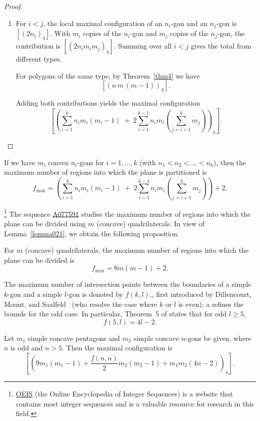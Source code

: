 \documentclass[article,11pt]{amsart} \numberwithin{equation}{section}
\numberwithin{equation}{section}
\begin{document}
{\begin{proof}
\begin{enumerate}
	\item[(ii)]
	For $i<j$, the local maximal configuration of an $n_i$-gon and an $n_j$-gon is $[(2n_i)_4]$.  
	With $m_i$ copies of the $n_i$-gon and $m_j$ copies of the $n_j$-gon, the contribution is $[(2n_i m_i m_j)_4]$.  
	Summing over all $i<j$ gives the total from different types.  
	
	For polygons of the same type, by Theorem~\ref{thm4} we have $$[(n\,m\,(m-1))_4].$$  
	
	Adding both contributions yields the maximal configuration
	\[
	\left[ \left( \sum_{i=1}^{k} n_i m_i (m_i-1) \;+\; 2\sum_{i=1}^{k-1} n_i m_i \left( \sum_{j=i+1}^{k} m_j \right) \right)_4 \right].
	\]
	
\end{enumerate}	
\end{proof}

\begin{cor}
If we have $m_i$ convex $n_i$-gons for $i=1,\dots,k$ (with $n_1 < n_2 < \dots < n_k$), then the maximum number of regions into which the plane is partitioned is
\[
f_{\max}= \left( \sum_{i=1}^{k} n_i m_i (m_i-1) \;+\; 2\sum_{i=1}^{k-1} n_i m_i \left( \sum_{j=i+1}^{k} m_j \right) \right) + 2.
\]

\end{cor}
\footnote{\href{https://oeis.org/}{OEIS} (the Online Encyclopedia of Integer Sequences) is a website that contains most integer sequences and is a valuable resource for research in this field.} The sequence \href{https://oeis.org/search?q=A077591&language=english&go=Search}{A077591} studies the maximum number of regions into which the plane can be divided using $m$ (concave) quadrilaterals. In view of Lemma~\ref{lemma021}, we obtain the following proposition.

\begin{inp}
For $m$ (concave) quadrilaterals, the maximum number of regions into which the plane can be divided is
\[
f_{\max}= 8m(m-1)+2.
\]
\end{inp}

The maximum number of intersection points between the boundaries of a simple $k$-gon and a simple $l$-gon is denoted by $f(k,l)$,, first introduced by Dillencourt, Mount, and Saalfeld~\cite{DMS93} (who resolve the case where $k$ or $l$ is even); a \cite{Cerny} refines the bounds for the odd case. In particular, Theorem~5 of \cite{Cerny} states that for odd $l\ge 5$,
\[
f(5,l)=4l-2.
\]

\begin{inp}\label{pro3.11}
Let $m_1$ simple concave pentagons and $m_2$ simple concave $n$-gons be given, where $n$ is odd and $n > 5$. Then the maximal configuration is
\[
\left[\left(9m_1(m_1 - 1) + \frac{f(n,n)}{2} m_2(m_2 - 1) + m_1m_2(4n - 2)\right)_4\right].
\]


\end{inp}}
\end{document}
